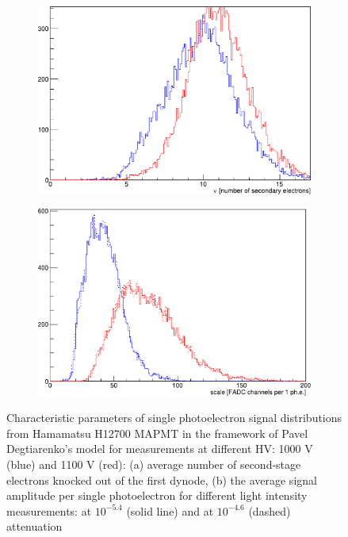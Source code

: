 \begin{figure}[b]
	\centering
	\begin{subfigure}{0.48\linewidth}
	\includegraphics[width=\linewidth]{figures/nu.pdf}
	\caption{}
	\label{fig:nu}

	\end{subfigure}
	\begin{subfigure}{0.48\linewidth}
	\includegraphics[width=\linewidth]{figures/scale.pdf}
	\caption{}
	\label{fig:scale}
	\end{subfigure}

	\caption{Characteristic parameters of single photoelectron signal distributions from Hamamatsu H12700 MAPMT in the framework of Pavel Degtiarenko's model for measurements at different HV: 1000 V (blue) and 1100 V (red):
		(a) average number of second-stage electrons knocked out of the first dynode,
		(b) the average signal amplitude per single photoelectron for different light intensity measurements: at $10^{-5.4}$ (solid line) and at $10^{-4.6}$ (dashed) attenuation}
	\label{fig:characteristicPars}
\end{figure}


